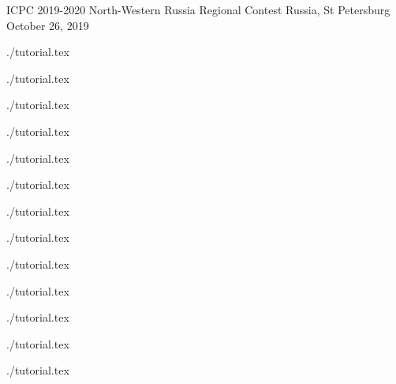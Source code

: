 \documentclass [11pt, a4paper, oneside] {article}
\begin{document}
\contest
{ICPC 2019-2020 North-Western Russia Regional Contest}%
{Russia, St Petersburg}%
{October 26, 2019}%


\renewcommand{\t}{\texttt}


\def\ProblemIndex{A}
\graphicspath{{../../problems/accurate-movement/statements/english/}}
{./tutorial.tex}
    \def\ProblemIndex{B}
\graphicspath{{../../problems/bad-treap/statements/english/}}
{./tutorial.tex}
    \def\ProblemIndex{C}
\graphicspath{{../../problems/cross-stitch/statements/english/}}
{./tutorial.tex}
    \def\ProblemIndex{D}
\graphicspath{{../../problems/double-palindrome/statements/english/}}
{./tutorial.tex}
    \def\ProblemIndex{E}
\graphicspath{{../../problems/equidistant/statements/english/}}
{./tutorial.tex}
    \def\ProblemIndex{F}
\graphicspath{{../../problems/foreach/statements/english/}}
{./tutorial.tex}
    \def\ProblemIndex{G}
\graphicspath{{../../problems/golf/statements/english/}}
{./tutorial.tex}
    \def\ProblemIndex{H}
\graphicspath{{../../problems/high/statements/english/}}
{./tutorial.tex}
    \def\ProblemIndex{I}
\graphicspath{{../../problems/ideal/statements/english/}}
{./tutorial.tex}
    \def\ProblemIndex{J}
\graphicspath{{../../problems/just-the-last-digit/statements/english/}}
{./tutorial.tex}
    \def\ProblemIndex{K}
\graphicspath{{../../problems/kingdom/statements/english/}}
{./tutorial.tex}
    \def\ProblemIndex{L}
\graphicspath{{../../problems/lengths/statements/english/}}
{./tutorial.tex}
    \def\ProblemIndex{M}
\graphicspath{{../../problems/managing/statements/english/}}
{./tutorial.tex}
\end{document}
